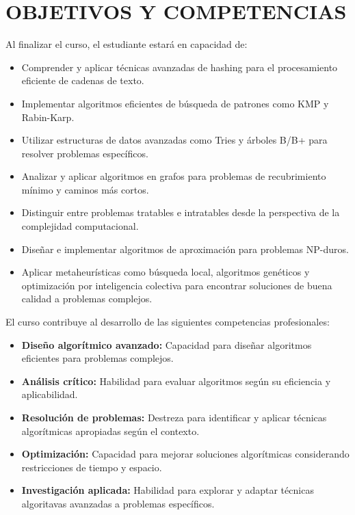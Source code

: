 \documentclass[12pt,a4paper]{article}
\begin{document}
\section{OBJETIVOS Y COMPETENCIAS}

\begin{objetivos}
Al finalizar el curso, el estudiante estará en capacidad de:
\begin{itemize}[leftmargin=*]
    \item Comprender y aplicar técnicas avanzadas de hashing para el procesamiento eficiente de cadenas de texto.
    \item Implementar algoritmos eficientes de búsqueda de patrones como KMP y Rabin-Karp.
    \item Utilizar estructuras de datos avanzadas como Tries y árboles B/B+ para resolver problemas específicos.
    \item Analizar y aplicar algoritmos en grafos para problemas de recubrimiento mínimo y caminos más cortos.
    \item Distinguir entre problemas tratables e intratables desde la perspectiva de la complejidad computacional.
    \item Diseñar e implementar algoritmos de aproximación para problemas NP-duros.
    \item Aplicar metaheurísticas como búsqueda local, algoritmos genéticos y optimización por inteligencia colectiva para encontrar soluciones de buena calidad a problemas complejos.
\end{itemize}
\end{objetivos}

\begin{competencias}
El curso contribuye al desarrollo de las siguientes competencias profesionales:
\begin{itemize}[leftmargin=*]
    \item \textbf{Diseño algorítmico avanzado:} Capacidad para diseñar algoritmos eficientes para problemas complejos.
    \item \textbf{Análisis crítico:} Habilidad para evaluar algoritmos según su eficiencia y aplicabilidad.
    \item \textbf{Resolución de problemas:} Destreza para identificar y aplicar técnicas algorítmicas apropiadas según el contexto.
    \item \textbf{Optimización:} Capacidad para mejorar soluciones algorítmicas considerando restricciones de tiempo y espacio.
    \item \textbf{Investigación aplicada:} Habilidad para explorar y adaptar técnicas algoritavas avanzadas a problemas específicos.
\end{itemize}
\end{competencias}
\vspace{0.5cm}
\end{document}
